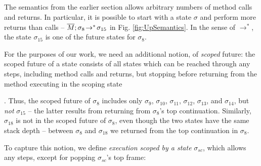  
 \subsection{ }
 \label{sect:bounded}

{The semantics from the earlier section allows arbitrary numbers of method calls and returns. 
In particular, it is possible to start with a state $\sigma$ and perform more returns than calls --
\eg $\overline{M};\sigma_{8}\! \rightarrow^*\! {\sigma_{15}}$  in  Fig. \ref{fig:UpSemantics}.
{In the sense of $\rightarrow^*$,  the state $\sigma_{15}$  is one of the future  states for $\sigma_8$.}

 
{For} the purposes of our work, we   need an {additional} notion, of  \emph{scoped} future:  
the scoped future of a state consists of all states which  can be reached through any   
 steps, including method calls and returns, but   {stopping before returning}   
from the method executing in the scoping state}. 
Thus, the {scoped} future  of $\sigma_8$   includes only
  $\sigma_9$, $\sigma_{10}$, $\sigma_{11}$, $\sigma_{12}$, $\sigma_{13}$, and $\sigma_{14}$, but \emph{not} $\sigma_{15}$  -- the latter results from returning from $\sigma_{8}$'s top continuation.  
 {Similarly, $\sigma_{18}$ is not in the scoped future of $\sigma_8$, even though the two states have the same stack depth -- between $\sigma_{8}$  and  $\sigma_{18}$ we returned from the top continuation in $\sigma_{8}$.}
 
 
\renewcommand{\bd}{_{sc}}
 

To capture this  notion, we define  %
{\emph{execution scoped by a state} $\sigma\bd$, which %
allows any steps, except for popping   $\sigma\bd$'s top frame:}
 
